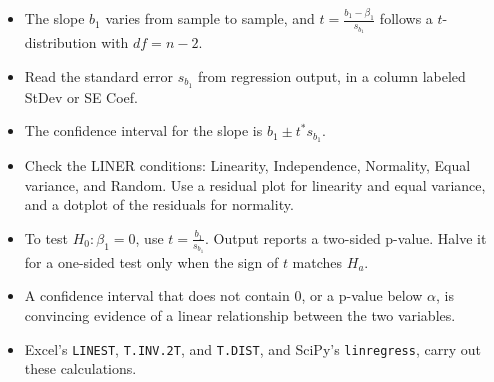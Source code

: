 \begin{mdframed}[style=important, frametitle={Key Ideas}]
\begin{itemize}
\item The slope $b_1$ varies from sample to sample, and $t = \frac{b_1 - \beta_1}{s_{b_1}}$ follows a $t$-distribution with $df = n - 2$.
\item Read the standard error $s_{b_1}$ from regression output, in a column labeled StDev or SE Coef.
\item The confidence interval for the slope is $b_1 \pm t^* s_{b_1}$.
\item Check the LINER conditions: Linearity, Independence, Normality, Equal variance, and Random. Use a residual plot for linearity and equal variance, and a dotplot of the residuals for normality.
\item To test $H_0: \beta_1 = 0$, use $t = \frac{b_1}{s_{b_1}}$. Output reports a two-sided p-value. Halve it for a one-sided test only when the sign of $t$ matches $H_a$.
\item A confidence interval that does not contain 0, or a p-value below $\alpha$, is convincing evidence of a linear relationship between the two variables.
\item Excel's \texttt{LINEST}, \texttt{T.INV.2T}, and \texttt{T.DIST}, and SciPy's \texttt{linregress}, carry out these calculations.
\end{itemize}
\end{mdframed}
